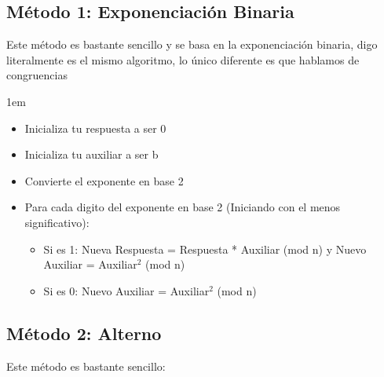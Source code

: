 \documentclass[12pt]{report}                                    %
\newenvironment{SmallIndentation}[1][0.75em]                    %
    {\begin{adjustwidth}{#1}{}\begin{footnotesize}}                 %
    {\end{footnotesize}\end{adjustwidth}}                           %
\begin{document}
        \subsection*{Método 1: Exponenciación Binaria}

            Este método es bastante sencillo y se basa en la exponenciación binaria, digo
            literalmente es el mismo algoritmo, lo único diferente es que hablamos de congruencias

            \begin{SmallIndentation}[1em]
                
                \begin{itemize}
                    \item   Inicializa tu respuesta a ser 0
                    \item   Inicializa tu auxiliar a ser b
                    \item   Convierte el exponente en base 2

                    \item Para cada digito del exponente en base 2 (Iniciando con
                          el menos significativo):
                        
                        \begin{itemize}
                            \item Si es 1:
                                    Nueva Respuesta = Respuesta * Auxiliar (mod n) y Nuevo Auxiliar = Auxiliar$^2$ (mod n)
                            \item Si es 0:
                                    Nuevo Auxiliar = Auxiliar$^2$ (mod n)
                        \end{itemize}
                \end{itemize}

            \end{SmallIndentation}


        \clearpage
        \subsection*{Método 2: Alterno}

            Este método es bastante sencillo:
\end{document}
